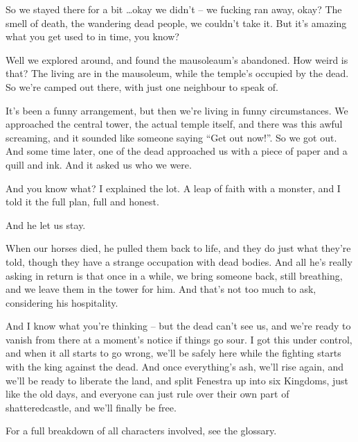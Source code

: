 \begin{multicols}{2}
\begin{exampletext}
	So we stayed there for a bit \ldots okay we didn't -- we fucking ran away, okay?  The smell of death, the wandering dead people, we couldn't take it.
But it's amazing what you get used to in time, you know?

	Well we explored around, and found the mausoleaum's abandoned.  How weird is that?  The living are in the mausoleum, while the temple's occupied by the dead.  So we're camped out there, with just one neighbour to speak of.

	It's been a funny arrangement, but then we're living in funny circumstances.  We approached the central tower, the actual temple itself, and there was this awful screaming, and it sounded like someone saying ``Get out now!''.  So we got out.  And some time later, one of the dead approached us with a piece of paper and a quill and ink.  And it asked us who we were.

	And you know what?  I explained the lot.  A leap of faith with a monster, and I told it the full plan, full and honest.

	And he let us stay.

	When our horses died, he pulled them back to life, and they do just what they're told, though they have a strange occupation with dead bodies.  And all he's really asking in return is that once in a while, we bring someone back, still breathing, and we leave them in the tower for him.  And that's not too much to ask, considering his hospitality.

	And I know what you're thinking -- but the dead can't see us, and we're ready to vanish from there at a moment's notice if things go sour.  I got this under control, and when it all starts to go wrong, we'll be safely here while the fighting starts with the king against the dead.  And once everything's ash, we'll rise again, and we'll be ready to liberate the land, and split Fenestra up into six Kingdoms, just like the old days, and everyone can just rule over their own part of \gls{shatteredcastle}, and we'll finally be free.

\end{exampletext}

For a full breakdown of all characters involved, see the glossary.

\end{multicols}
